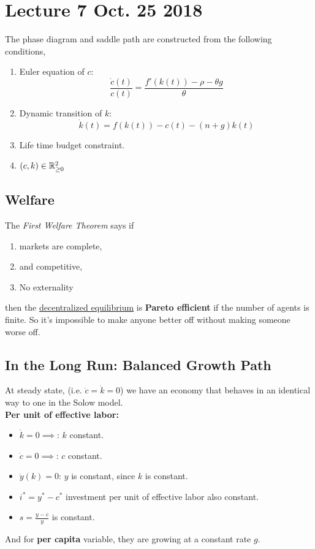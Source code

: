 \documentclass[]{article}
\begin{document}
	\section{Lecture 7 Oct. 25 2018}
		\begin{remark} The phase diagram and saddle path are constructed from the following conditions,
			\begin{enumerate}
				\item Euler equation of $c$: \[ \frac{\dot{c}(t)}{c(t)} = \frac{f'(k(t)) - \rho - \theta g}{\theta} \]
				\item Dynamic transition of $k$: \[ \dot{k}(t) = f(k(t)) - c(t) - (n+g)k(t) \]
				\item Life time budget constraint.
				\item $(c,k) \in \mathbb{R}_{\geq 0}^2$
			\end{enumerate}
		\end{remark}
		
		\subsection{Welfare}
			\par The \emph{First Welfare Theorem} says if 
			\begin{enumerate}
				\item markets are complete,
				\item and competitive,
				\item No externality
			\end{enumerate} then the \ul{decentralized equilibrium} is \textbf{Pareto efficient} if the number of agents is finite. So it's impossible to make anyone better off without making someone worse off.
		
		\subsection{In the Long Run: Balanced Growth Path}
			\par At steady state, (i.e. $\dot{c}=\dot{k}=0$) we have an economy that behaves in an identical way to one in the Solow model. \\
			\textbf{Per unit of effective labor: } 
			\begin{itemize}
				\item $\dot{k}=0\implies$: $k$ constant.
				\item $\dot{c}=0\implies$: $c$ constant.
				\item $\dot{y}(k)=0$: $y$ is constant, since $k$ is constant.
				\item $i^* = y^* - c^*$ investment per unit of effective labor also constant.
				\item $s = \frac{y-c}{y}$ is constant.
			\end{itemize}
			And for \textbf{per capita} variable, they are growing at a constant rate $g$.
			
\end{document}
